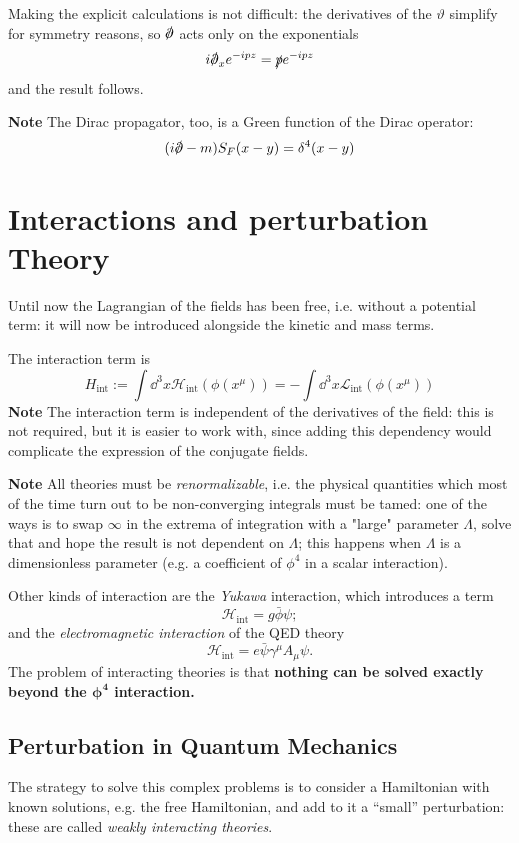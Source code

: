 
Making the explicit calculations is not difficult: the derivatives of the
$\vartheta$ simplify for symmetry reasons, so $\slashed{\pd}$ acts only on
the exponentials
$$i\slashed{\pd}_xe^{-ipz} = \slashed{p}e^{-ipz}$$
and the result follows.

\textbf{Note} The Dirac propagator, too, is a Green function of the Dirac operator:
$$(i\slashed{\pd}-m)S_F(x-y)=\delta^4(x-y)$$

\section{Interactions and perturbation Theory}
Until now the Lagrangian of the fields has been free, i.e. without a potential
term: it will now be introduced alongside the kinetic and mass terms.

The interaction term is
$$H_\text{int}:=\int \dd^3x\mathcal{H}_\text{int}(\phi(x^\mu))=-\int \dd^3x
\mathcal{L}_\text{int}(\phi(x^\mu))$$
\textbf{Note} The interaction term is independent of the derivatives of the
field: this is not required, but it is easier to work with, since adding
this dependency would complicate the expression of the conjugate fields.

\textbf{Note} All theories must be \textit{renormalizable}, i.e. the physical
quantities which most of the time turn out to be non-converging integrals must be
tamed: one of the ways is to swap $\infty$ in the extrema of integration with
a "large" parameter $\Lambda$, solve that and hope the result is not dependent on
$\Lambda$; this happens when $\Lambda$ is a dimensionless parameter (e.g. a
coefficient of $\phi^4$ in a scalar interaction).

Other kinds of interaction are the \textit{Yukawa} interaction, which introduces
a term
$$\mathcal{H}_\text{int}=g\bar\phi\psi;$$
and the \textit{electromagnetic interaction} of the QED theory
$$\mathcal{H}_\text{int}= e\bar\psi\gamma^\mu A_\mu\psi.$$
The problem of interacting theories is that \textbf{nothing can be solved exactly
beyond the $\mathbf{\phi^4}$ interaction.}
\subsection{Perturbation in Quantum Mechanics}
The strategy to solve this complex problems is to consider a Hamiltonian with
known solutions, e.g. the free Hamiltonian, and add to it a ``small''
perturbation: these are called \textit{weakly interacting theories}.

